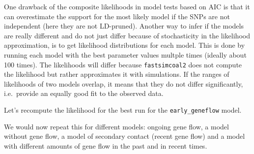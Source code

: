 \documentclass[
  letterpaper,
  DIV=11,
  numbers=noendperiod]{scrartcl}
\newenvironment{Shaded}{\begin{snugshade}}{\end{snugshade}}
\newcommand{\NormalTok}[1]{\textcolor[rgb]{0.00,0.23,0.31}{#1}}
\begin{document}
One drawback of the composite likelihoods in model tests based on AIC is
that it can overestimate the support for the most likely model if the
SNPs are not independent (here they are not LD-pruned). Another way to
infer if the models are really different and do not just differ because
of stochasticity in the likelihood approximation, is to get likelihood
distributions for each model. This is done by running each model with
the best parameter values multple times (ideally about 100 times). The
likelihoods will differ because \texttt{fastsimcoal2} does not compute
the likelihood but rather approximates it with simulations. If the
ranges of likelihoods of two models overlap, it means that they do not
differ significantly, i.e.~provide an equally good fit to the observed
data.

Let's recompute the likelihood for the best run for the
\texttt{early\_geneflow} model.

\begin{Shaded}
\end{Shaded}

We would now repeat this for different models: ongoing gene flow, a
model without gene flow, a model of secondary contact (recent gene flow)
and a model with different amounts of gene flow in the past and in
recent times.
\end{document}
